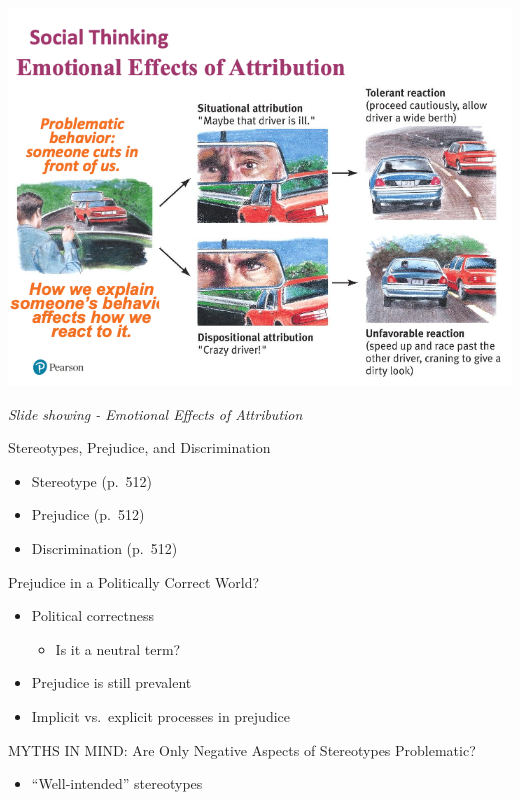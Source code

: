 \documentclass[
]{book}
\providecommand{\tightlist}{%
  \setlength{\itemsep}{0pt}\setlength{\parskip}{0pt}}
\begin{document}
\begin{reflect}
\includegraphics{assets/unit_6/slide_32.png}

\emph{Slide showing - Emotional Effects of Attribution}

Stereotypes, Prejudice, and Discrimination

\begin{itemize}
\tightlist
\item
  Stereotype (p.~512)\\
\item
  Prejudice (p.~512)\\
\item
  Discrimination (p.~512)
\end{itemize}

Prejudice in a Politically Correct World?

\begin{itemize}
\tightlist
\item
  Political correctness

  \begin{itemize}
  \tightlist
  \item
    Is it a neutral term?\\
  \end{itemize}
\item
  Prejudice is still prevalent\\
\item
  Implicit vs.~explicit processes in prejudice
\end{itemize}

MYTHS IN MIND: Are Only Negative Aspects of Stereotypes Problematic?

\begin{itemize}
\tightlist
\item
  ``Well-intended'' stereotypes


\end{itemize}
\end{reflect}
\end{document}

